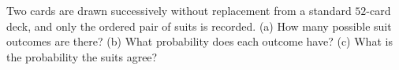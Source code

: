 Two cards are drawn successively without replacement from a standard $52$-card deck, and only the ordered pair of suits is recorded. (a) How many possible suit outcomes are there? (b) What probability does each outcome have? (c) What is the probability the suits agree?
